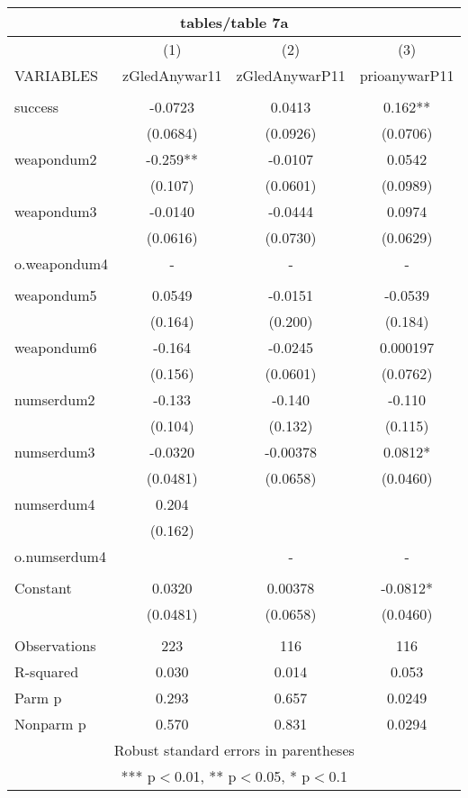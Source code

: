 \documentclass[]{article}
\begin{document}
\begin{tabular}{lccc}
\multicolumn{4}{c}{tables/table 7a} \\ \hline
 & (1) & (2) & (3) \\
VARIABLES & zGledAnywar11 & zGledAnywarP11 & prioanywarP11 \\ \hline
 &  &  &  \\
success & -0.0723 & 0.0413 & 0.162** \\
 & (0.0684) & (0.0926) & (0.0706) \\
weapondum2 & -0.259** & -0.0107 & 0.0542 \\
 & (0.107) & (0.0601) & (0.0989) \\
weapondum3 & -0.0140 & -0.0444 & 0.0974 \\
 & (0.0616) & (0.0730) & (0.0629) \\
o.weapondum4 & - & - & - \\
 &  &  &  \\
weapondum5 & 0.0549 & -0.0151 & -0.0539 \\
 & (0.164) & (0.200) & (0.184) \\
weapondum6 & -0.164 & -0.0245 & 0.000197 \\
 & (0.156) & (0.0601) & (0.0762) \\
numserdum2 & -0.133 & -0.140 & -0.110 \\
 & (0.104) & (0.132) & (0.115) \\
numserdum3 & -0.0320 & -0.00378 & 0.0812* \\
 & (0.0481) & (0.0658) & (0.0460) \\
numserdum4 & 0.204 &  &  \\
 & (0.162) &  &  \\
o.numserdum4 &  & - & - \\
 &  &  &  \\
Constant & 0.0320 & 0.00378 & -0.0812* \\
 & (0.0481) & (0.0658) & (0.0460) \\
 &  &  &  \\
Observations & 223 & 116 & 116 \\
R-squared & 0.030 & 0.014 & 0.053 \\
Parm p & 0.293 & 0.657 & 0.0249 \\
 Nonparm p & 0.570 & 0.831 & 0.0294 \\ \hline
\multicolumn{4}{c}{ Robust standard errors in parentheses} \\
\multicolumn{4}{c}{ *** p$<$0.01, ** p$<$0.05, * p$<$0.1} \\
\end{tabular}
\end{document}
